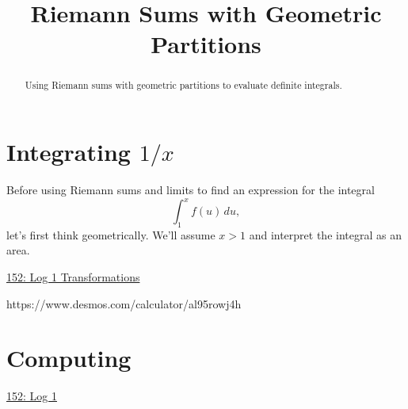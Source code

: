 \documentclass{ximera}
\title{Riemann Sums with Geometric Partitions}
\begin{document}
\begin{abstract}
Using Riemann sums with geometric partitions to evaluate definite integrals.
\end{abstract}
\maketitle



\section{Integrating $1/x$}

Before using Riemann sums and limits to find an expression for the integral
\[
     \int_1^x f(u)\, du ,
\]
let's first think geometrically. We'll assume $x>1$ and interpret the integral as an area.


\begin{onlineOnly}
    \begin{center}
\end{center}
\end{onlineOnly}

\href{https://www.desmos.com/calculator/al95rowj4h}{152: Log 1 Transformations}


https://www.desmos.com/calculator/al95rowj4h



\section{Computing}

\begin{onlineOnly}
    \begin{center}
\end{center}
\end{onlineOnly}

\href{https://www.desmos.com/calculator/rbcbxdrvcp}{152: Log 1}
\end{document}
